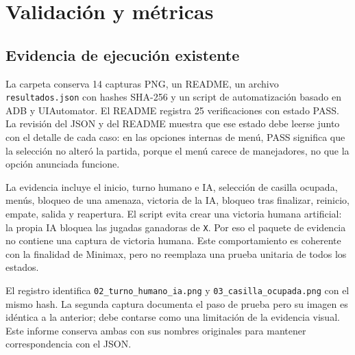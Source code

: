 \chapter{Validación y métricas}
\section{Evidencia de ejecución existente}
La carpeta  conserva 14 capturas PNG, un README, un archivo \texttt{resultados.json} con hashes SHA-256 y un script de automatización basado en ADB y UIAutomator. El README registra 25 verificaciones con estado PASS. La revisión del JSON y del README muestra que ese estado debe leerse junto con el detalle de cada caso: en las opciones internas de menú, PASS significa que la selección no alteró la partida, porque el menú carece de manejadores, no que la opción anunciada funcione.

La evidencia incluye el inicio, turno humano e IA, selección de casilla ocupada, menús, bloqueo de una amenaza, victoria de la IA, bloqueo tras finalizar, reinicio, empate, salida y reapertura. El script evita crear una victoria humana artificial: la propia IA bloquea las jugadas ganadoras de \texttt{X}. Por eso el paquete de evidencia no contiene una captura de victoria humana. Este comportamiento es coherente con la finalidad de Minimax, pero no reemplaza una prueba unitaria de todos los estados.

El registro identifica \texttt{02\_turno\_humano\_ia.png} y \texttt{03\_casilla\_ocupada.png} con el mismo hash. La segunda captura documenta el paso de prueba pero su imagen es idéntica a la anterior; debe contarse como una limitación de la evidencia visual. Este informe conserva ambas con sus nombres originales para mantener correspondencia con el JSON.

